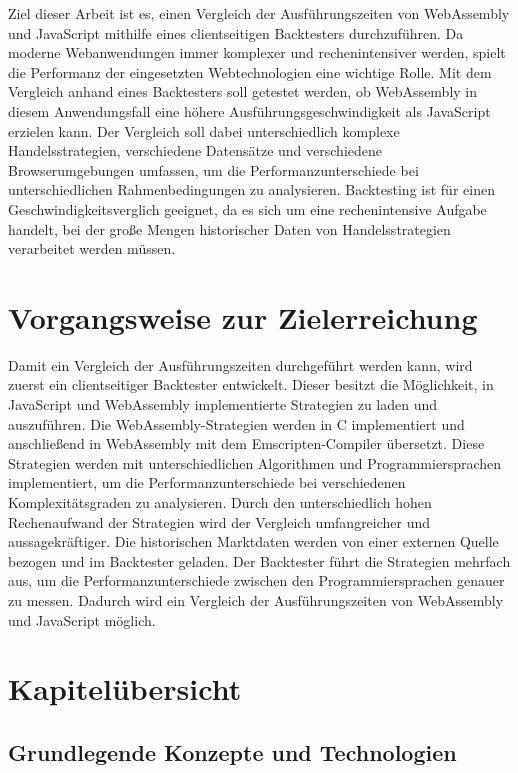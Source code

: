 Ziel dieser Arbeit ist es, einen Vergleich der Ausführungszeiten von WebAssembly und JavaScript mithilfe eines clientseitigen Backtesters durchzuführen.
Da moderne Webanwendungen immer komplexer und rechenintensiver werden, spielt die Performanz der eingesetzten Webtechnologien eine wichtige Rolle.
Mit dem Vergleich anhand eines Backtesters soll getestet werden, ob WebAssembly in diesem Anwendungsfall eine höhere Ausführungsgeschwindigkeit als JavaScript erzielen kann.
Der Vergleich soll dabei unterschiedlich komplexe Handelsstrategien, verschiedene Datensätze und verschiedene Browserumgebungen umfassen, um die Performanzunterschiede bei unterschiedlichen Rahmenbedingungen zu analysieren.
Backtesting ist für einen Geschwindigkeitsverglich geeignet, da es sich um eine rechenintensive Aufgabe handelt, bei der große Mengen historischer Daten von Handelsstrategien verarbeitet werden müssen.

\section{Vorgangsweise zur Zielerreichung}
\label{sec:VorgangsweisezurZielerreichung}

Damit ein Vergleich der Ausführungszeiten durchgeführt werden kann, wird zuerst ein clientseitiger Backtester entwickelt.
Dieser besitzt die Möglichkeit, in JavaScript und WebAssembly implementierte Strategien zu laden und auszuführen.
\newline
Die WebAssembly-Strategien werden in C implementiert und anschließend in WebAssembly mit dem Emscripten-Compiler übersetzt.
Diese Strategien werden mit unterschiedlichen Algorithmen und Programmiersprachen implementiert, um die Performanzunterschiede bei verschiedenen Komplexitätsgraden zu analysieren.
Durch den unterschiedlich hohen Rechenaufwand der Strategien wird der Vergleich umfangreicher und aussagekräftiger.
\newline
Die historischen Marktdaten werden von einer externen Quelle bezogen und im Backtester geladen.
Der Backtester führt die Strategien mehrfach aus, um die Performanzunterschiede zwischen den Programmiersprachen genauer zu messen.
Dadurch wird ein Vergleich der Ausführungszeiten von WebAssembly und JavaScript möglich.

\section{Kapitelübersicht}
\label{sec:Kapitelübersicht}

\subsection{Grundlegende Konzepte und Technologien}
\label{subsec:GrundlegendeKonzepteundTechnologien}

